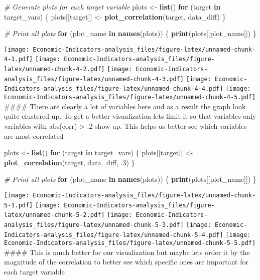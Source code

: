 \documentclass[
]{article}
\newenvironment{Shaded}{\begin{snugshade}}{\end{snugshade}}
\newcommand{\CommentTok}[1]{\textcolor[rgb]{0.56,0.35,0.01}{\textit{#1}}}
\newcommand{\ControlFlowTok}[1]{\textcolor[rgb]{0.13,0.29,0.53}{\textbf{#1}}}
\newcommand{\DecValTok}[1]{\textcolor[rgb]{0.00,0.00,0.81}{#1}}
\newcommand{\FunctionTok}[1]{\textcolor[rgb]{0.13,0.29,0.53}{\textbf{#1}}}
\newcommand{\NormalTok}[1]{#1}
\newcommand{\OtherTok}[1]{\textcolor[rgb]{0.56,0.35,0.01}{#1}}
\begin{document}
\begin{Shaded}
\begin{Highlighting}[]
\CommentTok{\# Generate plots for each target variable}
\NormalTok{plots }\OtherTok{\textless{}{-}} \FunctionTok{list}\NormalTok{()}
\ControlFlowTok{for}\NormalTok{ (target }\ControlFlowTok{in}\NormalTok{ target\_vars) \{}
\NormalTok{  plots[[target]] }\OtherTok{\textless{}{-}} \FunctionTok{plot\_correlation}\NormalTok{(target, data\_diff)}
\NormalTok{\}}

\CommentTok{\# Print all plots}
\ControlFlowTok{for}\NormalTok{ (plot\_name }\ControlFlowTok{in} \FunctionTok{names}\NormalTok{(plots)) \{}
  \FunctionTok{print}\NormalTok{(plots[[plot\_name]])}
\NormalTok{\}}
\end{Highlighting}
\end{Shaded}

\texttt{[image: Economic-Indicators-analysis\_files/figure-latex/unnamed-chunk-4-1.pdf]}
\texttt{[image: Economic-Indicators-analysis\_files/figure-latex/unnamed-chunk-4-2.pdf]}
\texttt{[image: Economic-Indicators-analysis\_files/figure-latex/unnamed-chunk-4-3.pdf]}
\texttt{[image: Economic-Indicators-analysis\_files/figure-latex/unnamed-chunk-4-4.pdf]}
\texttt{[image: Economic-Indicators-analysis\_files/figure-latex/unnamed-chunk-4-5.pdf]}
\#\#\#\# There are clearly a lot of variables here and as a result the
graph look quite clustered up. To get a better visualization lets limit
it so that variables only variables with abs(corr) \textgreater{} .2
show up. This helps us better see which variables are most correlated

\begin{Shaded}
\begin{Highlighting}[]
\NormalTok{plots }\OtherTok{\textless{}{-}} \FunctionTok{list}\NormalTok{()}
\ControlFlowTok{for}\NormalTok{ (target }\ControlFlowTok{in}\NormalTok{ target\_vars) \{}
\NormalTok{  plots[[target]] }\OtherTok{\textless{}{-}} \FunctionTok{plot\_correlation}\NormalTok{(target, data\_diff, .}\DecValTok{3}\NormalTok{)}
\NormalTok{\}}

\CommentTok{\# Print all plots}
\ControlFlowTok{for}\NormalTok{ (plot\_name }\ControlFlowTok{in} \FunctionTok{names}\NormalTok{(plots)) \{}
  \FunctionTok{print}\NormalTok{(plots[[plot\_name]])}
\NormalTok{\}}
\end{Highlighting}
\end{Shaded}

\texttt{[image: Economic-Indicators-analysis\_files/figure-latex/unnamed-chunk-5-1.pdf]}
\texttt{[image: Economic-Indicators-analysis\_files/figure-latex/unnamed-chunk-5-2.pdf]}
\texttt{[image: Economic-Indicators-analysis\_files/figure-latex/unnamed-chunk-5-3.pdf]}
\texttt{[image: Economic-Indicators-analysis\_files/figure-latex/unnamed-chunk-5-4.pdf]}
\texttt{[image: Economic-Indicators-analysis\_files/figure-latex/unnamed-chunk-5-5.pdf]}
\#\#\#\# This is much better for our visualization but maybe lets order
it by the magnitude of the correlation to better see which specific ones
are important for each target variable
\end{document}
